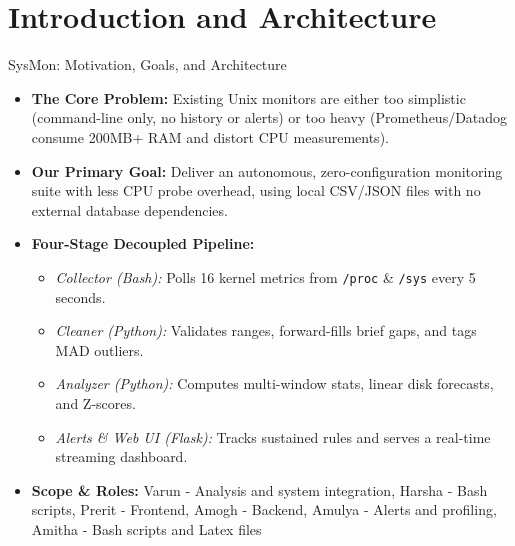 \section{Introduction and Architecture}

\begin{frame}{SysMon: Motivation, Goals, and Architecture}
    \begin{itemize}
        \setlength{\itemsep}{10pt}
        \item \textbf{The Core Problem:} Existing Unix monitors are either too simplistic (command-line only, no history or alerts) or too heavy (Prometheus/Datadog consume 200MB+ RAM and distort CPU measurements).
        \item \textbf{Our Primary Goal:} Deliver an autonomous, zero-configuration monitoring suite with less CPU probe overhead, using local CSV/JSON files with no external database dependencies.
        \item \textbf{Four-Stage Decoupled Pipeline:}
        \begin{itemize}
            \setlength{\itemsep}{3pt}
            \item \textit{Collector (Bash):} Polls 16 kernel metrics from \texttt{/proc} \& \texttt{/sys} every 5 seconds.
            \item \textit{Cleaner (Python):} Validates ranges, forward-fills brief gaps, and tags MAD outliers.
            \item \textit{Analyzer (Python):} Computes multi-window stats, linear disk forecasts, and Z-scores.
            \item \textit{Alerts \& Web UI (Flask):} Tracks sustained rules and serves a real-time streaming dashboard.
        \end{itemize}
        \item \textbf{Scope \& Roles:} Varun - Analysis and system integration,
        Harsha - Bash scripts,
        Prerit - Frontend,
        Amogh - Backend,
        Amulya - Alerts and profiling,
        Amitha - Bash scripts and Latex files
    \end{itemize}
\end{frame}
